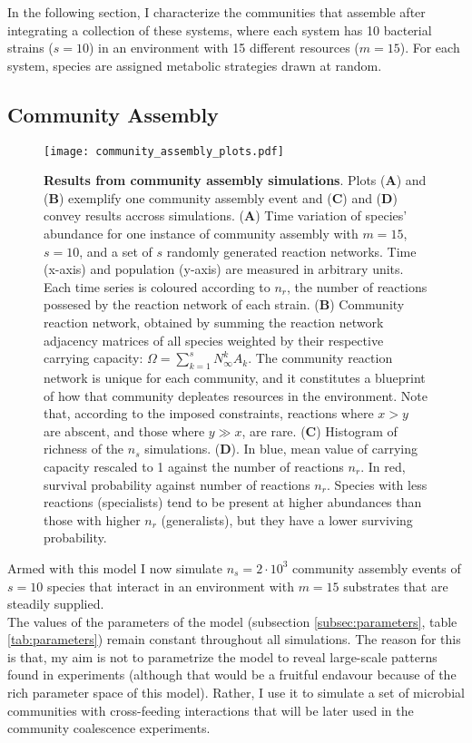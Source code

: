 \documentclass[titlepage,11pt]{article}
\begin{document}
\begin{linenumbers}
\begin{singlespace}
				In the following section, I characterize the communities that assemble after integrating a collection of these systems, where each system has 10 bacterial strains ($ s = 10 $) in an environment with 15 different resources ($ m = 15 $). For each system, species are assigned metabolic strategies drawn at random.\\
				
				\subsection{Community Assembly}
				\begin{figure}
					\centering			
					\texttt{[image: community\_assembly\_plots.pdf]}
					\caption{\textbf{Results from community assembly simulations}. Plots (\textbf{A}) and (\textbf{B}) exemplify one community assembly event and  (\textbf{C}) and (\textbf{D}) convey results accross simulations. (\textbf{A}) Time variation of species' abundance for one instance of community assembly with $ m = 15 $, $ s = 10 $, and a set of $ s $ randomly generated reaction networks. Time (x-axis) and population (y-axis) are measured in arbitrary units. Each time series is coloured according to $ n_r $, the number of reactions possesed by the reaction network of each strain. (\textbf{B}) Community reaction network, obtained by summing the reaction network adjacency matrices of all species weighted by their respective carrying capacity: $ \Omega = \sum_{k = 1}^{s} N^k_{\infty}A_k  $. The community reaction network is unique for each community, and it constitutes a blueprint of how that community depleates resources in the environment. Note that, according to the imposed constraints, reactions where $ x > y $ are abscent, and those where $ y \gg  x $, are rare. (\textbf{C}) Histogram of richness of the $ n_s $ simulations. (\textbf{D}). In blue, mean value of carrying capacity rescaled to 1 against the number of reactions $ n_r $. In red, survival probability against number of reactions $ n_r $. Species with less reactions (specialists) tend to be present at higher abundances than those with higher $ n_r $ (generalists), but they have a lower surviving probability.}
					\label{fig:community_assembly_results}
				\end{figure}
				Armed with this model I now simulate $ n_{s} = 2 \cdot 10^3 $ community assembly events of $ s = 10 $ species that interact in an environment with $ m = 15 $ substrates that are steadily supplied.\\
				The values of the parameters of the model (subsection \ref{subsec:parameters}, table \ref{tab:parameters}) remain constant throughout all simulations. The reason for this is that, my aim is not to parametrize the model to reveal large-scale patterns found in experiments (although that would be a fruitful endavour because of the rich parameter space of this model). Rather, I use it to simulate a set of microbial communities with cross-feeding interactions that will be later used in the community coalescence experiments.\\

\end{singlespace}
\end{linenumbers}
\end{document}
